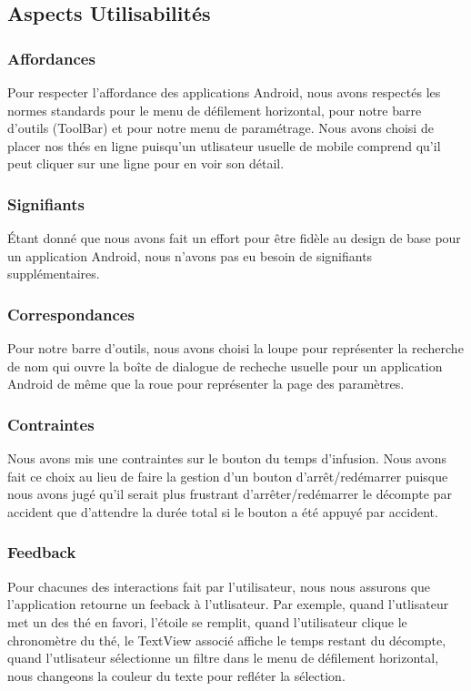 \documentclass[a4paper,12pt]{article}
\begin{document}
\begin{spacing}{1}
	\section*{Aspects Utilisabilités}
	\subsubsection*{Affordances}
	Pour respecter l'affordance des applications Android, nous avons respectés les normes standards pour le menu de défilement horizontal, pour notre barre d'outils (ToolBar) et pour notre menu de paramétrage. Nous avons choisi de placer nos thés en ligne puisqu'un utlisateur usuelle de mobile comprend qu'il peut cliquer sur une ligne pour en voir son détail.
	\subsubsection*{Signifiants}
	Étant donné que nous avons fait un effort pour être fidèle au design de base pour un application Android, nous n'avons pas eu besoin de signifiants supplémentaires.
	\subsubsection*{Correspondances}
	Pour notre barre d'outils, nous avons choisi la loupe pour représenter la recherche de nom qui ouvre la boîte de dialogue de recheche usuelle pour un application Android de même que la roue pour représenter la page des paramètres.
	\subsubsection*{Contraintes}
	Nous avons mis une contraintes sur le bouton du temps d'infusion. Nous avons fait ce choix au lieu de faire la gestion d'un bouton d'arrêt/redémarrer puisque nous avons jugé qu'il serait plus frustrant d'arrêter/redémarrer le décompte par accident que d'attendre la durée total si le bouton a été appuyé par accident.
	\subsubsection*{Feedback}
	Pour chacunes des interactions fait par l'utilisateur, nous nous assurons que l'application retourne un feeback à l'utlisateur. Par exemple, quand l'utlisateur met un des thé en favori, l'étoile se remplit, quand l'utilisateur clique le chronomètre du thé, le TextView associé affiche le temps restant du décompte, quand l'utlisateur sélectionne un filtre dans le menu de défilement horizontal, nous changeons la couleur du texte pour refléter la sélection.

\end{spacing}
\end{document}

